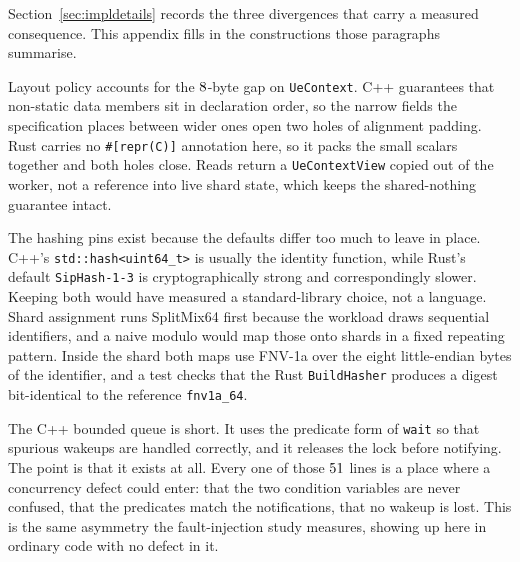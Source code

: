 \documentclass[english,oneside,a4paper,censored,csm,software-track-2020]{HYthesisML}
\begin{document}
\begin{appendices}
Section~\ref{sec:impldetails} records the three divergences that carry a measured consequence.
This appendix fills in the constructions those paragraphs summarise.

Layout policy accounts for the $8$-byte gap on \texttt{UeContext}. C++ guarantees
that non-static data members sit in declaration order, so the narrow fields the specification
places between wider ones open two holes of alignment padding. Rust carries no
\texttt{\#[repr(C)]} annotation here, so it packs the small scalars together and both holes
close. Reads return a \texttt{UeContextView} copied out of the worker, not a reference into live
shard state, which keeps the shared-nothing guarantee intact.

The hashing pins exist because the defaults differ too much to leave in place. C++'s
\texttt{std::hash<uint64\_t>} is usually the identity function, while Rust's default
\texttt{SipHash-1-3} is cryptographically strong and correspondingly slower. Keeping both would have
measured a standard-library choice, not a language. Shard assignment runs SplitMix64 first
because the workload draws sequential identifiers, and a naive modulo would map those onto shards
in a fixed repeating pattern. Inside the shard both maps use FNV-1a over the eight little-endian
bytes of the identifier, and a test checks that the Rust \texttt{BuildHasher} produces a digest
bit-identical to the reference \texttt{fnv1a\_64}.

The C++ bounded queue is short. It uses the predicate form of \texttt{wait} so that spurious
wakeups are handled correctly, and it releases the lock before notifying. The point is that it
exists at all. Every one of those $51$ lines is a place where a concurrency
defect could enter: that the two condition variables are never confused, that the predicates
match the notifications, that no wakeup is lost. This is the same asymmetry the fault-injection
study measures, showing up here in ordinary code with no defect in it.


\end{appendices}
\end{document}
